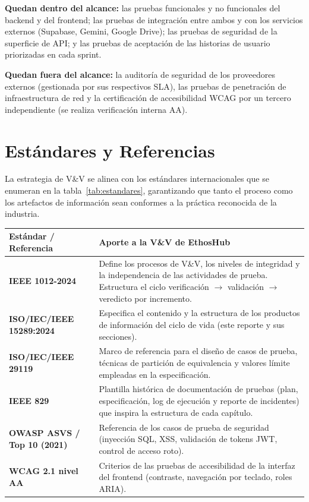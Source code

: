 \vspace{0.3cm}
\noindent\textbf{Quedan dentro del alcance:} las pruebas funcionales y no funcionales del
backend y del frontend; las pruebas de integración entre ambos y con los servicios
externos (Supabase, Gemini, Google Drive); las pruebas de seguridad de la superficie de
API; y las pruebas de aceptación de las historias de usuario priorizadas en cada sprint.

\noindent\textbf{Quedan fuera del alcance:} la auditoría de seguridad de los proveedores
externos (gestionada por sus respectivos SLA), las pruebas de penetración de
infraestructura de red y la certificación de accesibilidad WCAG por un tercero
independiente (se realiza verificación interna AA).

\section{Estándares y Referencias}
\label{sec:estandares}

La estrategia de V\&V se alinea con los estándares internacionales que se enumeran en la
tabla~\ref{tab:estandares}, garantizando que tanto el proceso como los artefactos de
información sean conformes a la práctica reconocida de la industria.

\vspace{0.2cm}
\noindent
\renewcommand{\arraystretch}{1.35}
\fontsize{8.5}{10.2}\selectfont\sffamily
\begin{tabularx}{\textwidth}{|>{\bfseries\color{colorPrimario}}p{4.2cm}|Y|}
\hline
{}
\sffamily\textbf{Estándar / Referencia} & \sffamily\textbf{Aporte a la V\&V de EthosHub} \\
\hline
IEEE 1012-2024 & Define los procesos de V\&V, los niveles de integridad y la
independencia de las actividades de prueba. Estructura el ciclo verificación
$\rightarrow$ validación $\rightarrow$ veredicto por incremento. \\
\hline
{}
ISO/IEC/IEEE 15289:2024 & Especifica el contenido y la estructura de los productos de
información del ciclo de vida (este reporte y sus secciones). \\
\hline
ISO/IEC/IEEE 29119 & Marco de referencia para el diseño de casos de prueba, técnicas de
partición de equivalencia y valores límite empleadas en la especificación. \\
\hline
{}
IEEE 829 & Plantilla histórica de documentación de pruebas (plan, especificación, log de
ejecución y reporte de incidentes) que inspira la estructura de cada capítulo. \\
\hline
OWASP ASVS / Top 10 (2021) & Referencia de los casos de prueba de seguridad
(inyección SQL, XSS, validación de tokens JWT, control de acceso roto). \\
\hline
{}
WCAG 2.1 nivel AA & Criterios de las pruebas de accesibilidad de la interfaz del
frontend (contraste, navegación por teclado, roles ARIA). \\
\hline
\end{tabularx}
\label{tab:estandares}

